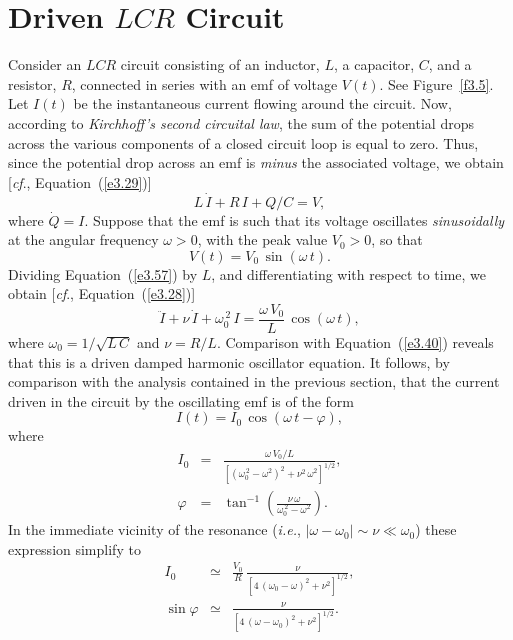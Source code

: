 \section{Driven $LCR$ Circuit}
Consider an $LCR$ circuit consisting of an inductor, $L$, a capacitor, $C$,  and a resistor, $R$,  connected
in series with an  emf   of voltage $V(t)$. See Figure~\ref{f3.5}. Let
$I(t)$ be the instantaneous current flowing around the circuit. 
Now, according to
{\em Kirchhoff's second circuital law}, the sum of the potential drops across the
various components of a closed circuit loop is equal to  zero. Thus, since the
potential drop across an emf   is {\em minus}\/ the associated voltage,
we obtain [{\em cf}., Equation~(\ref{e3.29})]
\begin{equation}\label{e3.57}
L\,\dot{I} + R\,I+ Q/C = V,
\end{equation}
where $\dot{Q}=I$. Suppose that the emf  is such that its voltage  oscillates
{\em sinusoidally}\/ at the angular frequency $\omega>0$, with the peak value $V_0>0$, so that
\begin{equation}
V(t) = V_0\,\sin(\omega\,t).
\end{equation}
Dividing Equation~(\ref{e3.57}) by $L$, and differentiating with respect to time,
we obtain [{\em cf}., Equation~(\ref{e3.28})]
\begin{equation}
\ddot{I} + \nu\,\dot{I} + \omega_0^{\,2}\,I = \frac{\omega\,V_0}{L}\,\cos(\omega\,t),
\end{equation}
where $\omega_0=1/\sqrt{L\,C}$ and $\nu=R/L$. Comparison with Equation~(\ref{e3.40}) reveals that this is a driven damped harmonic oscillator equation. 
It follows, by comparison with the analysis contained in the previous section, that
the current driven in the circuit by the oscillating emf  is of the form
\begin{equation}
I(t) = I_0\,\cos(\omega\,t-\varphi),
\end{equation}
where
\begin{eqnarray}
I_0&=& \frac{\omega\,V_0/L}{\left[(\omega_0^{\,2}-\omega^2)^2+\nu^2\,\omega^2\right]^{1/2}},\\[0.5ex]
\varphi &=&\tan^{-1}\left(\frac{\nu\,\omega}{\omega_0^{\,2}-\omega^2}\right).
\end{eqnarray}
In the immediate vicinity of the resonance ({\em i.e.}, $|\omega-\omega_0|\sim \nu\ll\omega_0$) these expression simplify to
\begin{eqnarray}
I_0 &\simeq & \frac{V_0}{R}\,\frac{\nu}{[4\,(\omega_0-\omega)^2+\nu^2]^{1/2}},\\[0.5ex]
\sin\varphi &\simeq& \frac{\nu}{[4\,(\omega-\omega_0)^2+\nu^2]^{1/2}}.
\end{eqnarray}
